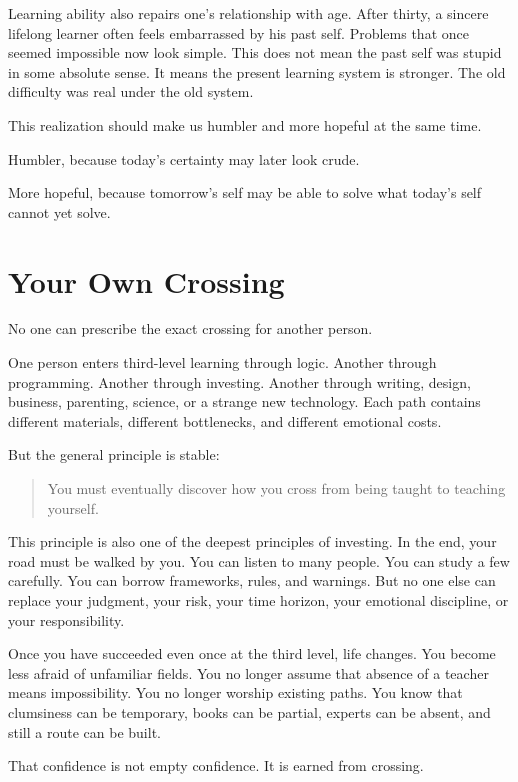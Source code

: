 Learning ability also repairs one's relationship with age. After thirty, a sincere lifelong learner often feels embarrassed by his past self. Problems that once seemed impossible now look simple. This does not mean the past self was stupid in some absolute sense. It means the present learning system is stronger. The old difficulty was real under the old system.

This realization should make us humbler and more hopeful at the same time.

Humbler, because today's certainty may later look crude.

More hopeful, because tomorrow's self may be able to solve what today's self cannot yet solve.

\section*{Your Own Crossing}

No one can prescribe the exact crossing for another person.

One person enters third-level learning through logic. Another through programming. Another through investing. Another through writing, design, business, parenting, science, or a strange new technology. Each path contains different materials, different bottlenecks, and different emotional costs.

But the general principle is stable:

\begin{quote}
You must eventually discover how you cross from being taught to teaching yourself.
\end{quote}

This principle is also one of the deepest principles of investing. In the end, your road must be walked by you. You can listen to many people. You can study a few carefully. You can borrow frameworks, rules, and warnings. But no one else can replace your judgment, your risk, your time horizon, your emotional discipline, or your responsibility.

Once you have succeeded even once at the third level, life changes. You become less afraid of unfamiliar fields. You no longer assume that absence of a teacher means impossibility. You no longer worship existing paths. You know that clumsiness can be temporary, books can be partial, experts can be absent, and still a route can be built.

That confidence is not empty confidence. It is earned from crossing.

